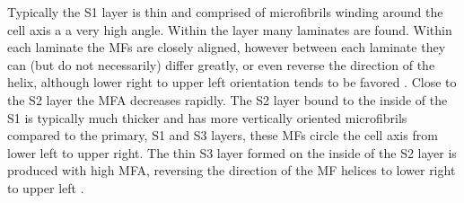 Typically the S1 layer is thin and comprised of microfibrils winding around the
cell axis a a very high angle. Within the layer many laminates are found.
Within each laminate the MFs are closely aligned, however between each laminate
they can (but do not necessarily) differ greatly, or even reverse the direction
of the helix, although lower right to upper left
orientation tends to be favored \citep{fromm2013cellular}. Close to the S2 layer the MFA decreases
rapidly. The S2 layer bound to the inside of the S1 is typically much thicker and
has more vertically oriented microfibrils compared to the primary, S1 and S3
layers, these MFs circle the cell axis from lower left to upper right. The thin S3 layer formed on the inside of the S2 layer is produced with
high MFA, reversing the direction of the MF helices to lower right to upper
left \citep{walker1993primary}.